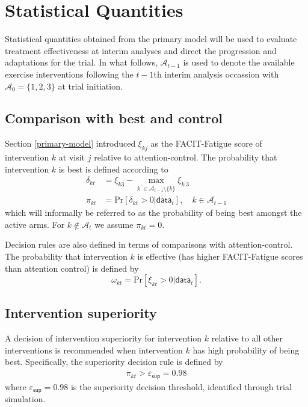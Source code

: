 \documentclass[11pt,parskip=half-]{scrartcl}
\begin{document}
\section{Statistical Quantities}\label{statistical-quantities}

Statistical quantities obtained from the primary model will be used to evaluate treatment effectiveness at interim analyses and direct the progression and adaptations for the trial. In what follows, $\mathcal{A}_{t-1}$ is used to denote the available exercise interventions following the $t-1$th interim analysis occassion with $\mathcal{A}_0=\{1,2,3\}$ at trial initiation.

\subsection{Comparison with best and control}\label{comparison-wth-best}

Section \ref{primary-model} introduced $\xi_{kj}$ as the FACIT-Fatigue score of intervention $k$ at visit $j$ relative to attention-control. The probability that intervention $k$ is best is defined according to
$$
  \begin{aligned}
    \delta_{kt} & = \xi_{k3} - \underset{k^\prime\in\mathcal{A}_{t-1}\setminus\{k\}}{\max}\xi_{k^\prime 3} \\
    \pi_{kt}    & = \text{Pr}[\delta_{kt}>0|\mathsf{data}_t], \quad k \in \mathcal{A}_{t-1}
  \end{aligned}
$$
which will informally be referred to as the probability of being best amongst the active arms. For $k\notin\mathcal{A}_t$ we assume $\pi_{kt}=0$.

Decision rules are also defined in terms of comparisons with attention-control. The probability that intervention $k$ is effective (has higher FACIT-Fatigue scores than attention control) is defined by
$$
  \omega_{kt} = \text{Pr}[\xi_{kt} > 0 | \mathsf{data}_t].
$$

\subsection{Intervention superiority}\label{intervention-superiority}

A decision of intervention superiority for intervention $k$ relative to all other interventions is recommended when intervention $k$ has high probability of being best. Specifically, the superiority decision rule is defined by
$$
  \begin{aligned}
    \pi_{kt} > \varepsilon_{\mathsf{sup}} = 0.98
  \end{aligned}
$$
where $\varepsilon_{\mathsf{sup}} = 0.98$ is the superiority decision threshold, identified through trial simulation.
\end{document}

